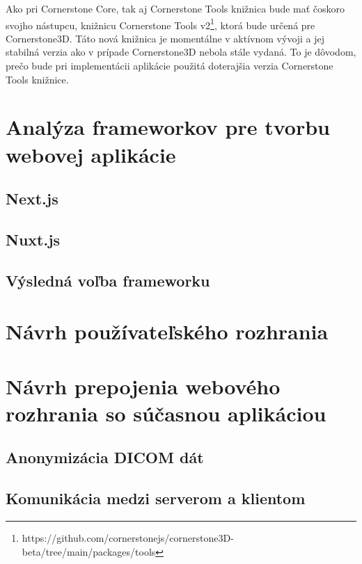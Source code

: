 Ako pri Cornerstone Core, tak aj Cornerstone Tools knižnica bude mať čoskoro svojho nástupcu, knižnicu Cornerstone Tools v2\footnote{https://github.com/cornerstonejs/cornerstone3D-beta/tree/main/packages/tools}, ktorá bude určená pre Cornerstone3D. Táto nová knižnica je momentálne v aktívnom vývoji a jej stabilná verzia ako v prípade Cornerstone3D nebola stále vydaná. To je dôvodom, prečo bude pri implementácii aplikácie použitá doterajšia verzia Cornerstone Tools knižnice.

\section {Analýza frameworkov pre tvorbu webovej aplikácie}


\subsection {Next.js}

\subsection {Nuxt.js}

\subsection {Výsledná voľba frameworku}

\section {Návrh používateľského rozhrania}


\section {Návrh prepojenia webového rozhrania so súčasnou aplikáciou}

\subsection {Anonymizácia DICOM dát}

\subsection {Komunikácia medzi serverom a klientom}

